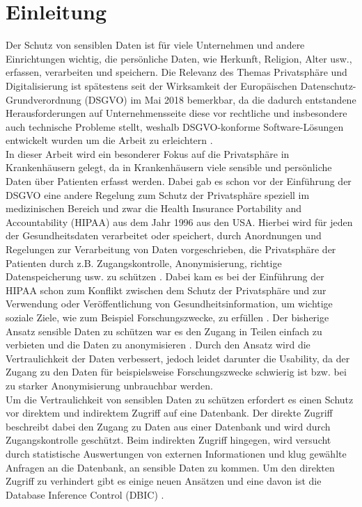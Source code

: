 \documentclass[german,version-2020-11]{uzl-thesis}
\begin{document}
\chapter{Einleitung}
Der Schutz von sensiblen Daten ist für viele Unternehmen und andere Einrichtungen wichtig, die persönliche Daten, wie Herkunft, Religion, Alter usw., erfassen, verarbeiten und speichern. Die Relevanz des Themas Privatsphäre und Digitalisierung ist spätestens seit der Wirksamkeit der Europäischen Datenschutz-Grundverordnung (DSGVO) \cite{1} im  Mai 2018 bemerkbar, da die dadurch entstandene Herausforderungen auf Unternehmensseite diese vor rechtliche und insbesondere auch technische Probleme stellt, weshalb DSGVO-konforme Software-Lösungen entwickelt wurden um die Arbeit zu erleichtern \cite{9}.\\ 
In dieser Arbeit wird ein besonderer Fokus auf die Privatsphäre in Krankenhäusern gelegt, da in Krankenhäusern viele sensible und persönliche Daten über Patienten erfasst werden. Dabei gab es schon vor der Einführung der DSGVO eine andere Regelung zum Schutz der Privatsphäre speziell im medizinischen Bereich und zwar die Health Insurance Portability and Accountability (HIPAA) aus dem Jahr 1996 aus den USA. Hierbei wird für jeden der Gesundheitsdaten verarbeitet oder speichert, durch Anordnungen und Regelungen zur Verarbeitung von Daten vorgeschrieben, die Privatsphäre der Patienten durch z.B. Zugangskontrolle, Anonymisierung, richtige Datenspeicherung usw. zu schützen \cite{7}. Dabei kam es bei der Einführung der HIPAA schon zum Konflikt zwischen dem Schutz der Privatsphäre und zur Verwendung oder Veröffentlichung von Gesundheitsinformation, um wichtige soziale Ziele, wie zum Beispiel Forschungszwecke, zu erfüllen \cite{8}. Der bisherige Ansatz sensible Daten zu schützen war es den Zugang in Teilen einfach zu verbieten und die Daten zu anonymisieren \cite{2}. Durch den Ansatz wird die Vertraulichkeit der Daten verbessert, jedoch leidet darunter die Usability, da der Zugang zu den Daten für beispielsweise Forschungszwecke schwierig ist bzw. bei zu starker Anonymisierung unbrauchbar werden. \\ 
Um die Vertraulichkeit von sensiblen Daten zu schützen erfordert es einen Schutz vor direktem und indirektem Zugriff auf eine Datenbank. Der direkte Zugriff beschreibt dabei den Zugang zu Daten aus einer Datenbank und wird durch Zugangskontrolle geschützt. Beim indirekten Zugriff hingegen, wird versucht durch statistische Auswertungen von externen Informationen und klug gewählte Anfragen an die Datenbank, an sensible Daten zu kommen. Um den direkten Zugriff zu verhindert gibt es einige neuen Ansätzen und eine davon ist die Database Inference Control (DBIC) \cite{22}.
\end{document}
